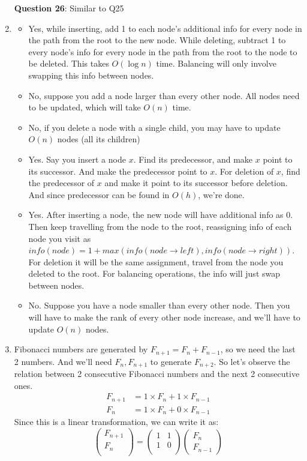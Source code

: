 \documentclass[12pt]{report}
\begin{document}
\begin{enumerate}[label=\textbf{\arabic*.}]
  \textbf{Question 26}:
  Similar to Q25

  \item 
  \begin{itemize}
    \item Yes, while inserting, add 1 to each node's additional info for every node in the path from the root to the new node. While deleting, 
    subtract 1 to every node's info for every node in the path from the root to the node to be deleted. This takes $O(\log n)$ time. Balancing 
    will only involve swapping this info between nodes.
    \item No, suppose you add a node larger than every other node. All nodes need to be updated, which will take $O(n)$ time.
    \item No, if you delete a node with a single child, you may have to update $O(n)$ nodes (all its children)
    \item Yes. Say you insert a node $x$. Find its predecessor, and make $x$ point to its successor. And make the predecessor point to $x$. For
    deletion of $x$, find the predecessor of $x$ and make it point to its successor before deletion. And since predecessor can be found in $O(h)$,
    we're done.
    \item Yes. After inserting a node, the new node will have additional info as 0. Then keep travelling from the node to the root, reassigning info
    of each node you visit as $info(node) = 1 + max(info(node \rightarrow left), info(node \rightarrow right))$. For deletion it will be the same
    assignment, travel from the node you deleted to the root. For balancing operations, the info will just swap between nodes.
    \item No. Suppose you have a node smaller than every other node. Then you will have to make the rank of every other node increase, and we'll 
    have to update $O(n)$ nodes.
  \end{itemize}

  \item Fibonacci numbers are generated by $F_{n+1} = F_n + F_{n-1}$, so we need the last 2 numbers. And we'll need $F_n, F_{n+1}$ to generate $F_{n+2}$.
  So let's observe the relation between 2 consecutive Fibonacci numbers and the next 2 consecutive ones.
  \begin{align*}
    F_{n+1} &= 1 \times F_n + 1 \times F_{n-1} \\
    F_n &= 1 \times F_n + 0 \times F_{n-1}
  \end{align*}
  Since this is a linear transformation, we can write it as:
  \[
  \begin{pmatrix}
    F_{n+1} \\
    F_n \\
  \end{pmatrix}
  =
  \begin{pmatrix}
    1 & 1 \\
    1 & 0 \\
  \end{pmatrix}
  \begin{pmatrix}
    F_n \\
    F_{n-1}
  \end{pmatrix}
  \]


\end{enumerate}
\end{document}
